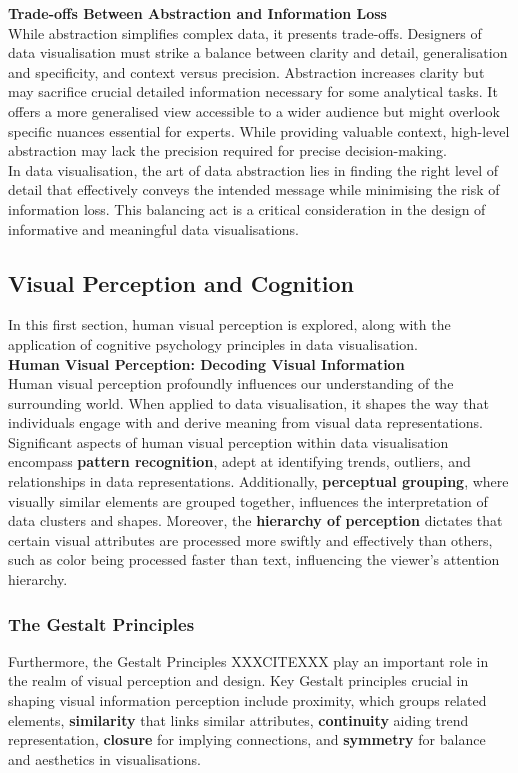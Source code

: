 \documentclass{article}\usepackage[]{graphicx}\usepackage[]{xcolor}
\begin{document}
\noindent \textbf{Trade-offs Between Abstraction and Information Loss}\\
While abstraction simplifies complex data, it presents trade-offs. Designers of data visualisation must strike a balance between clarity and detail, generalisation and specificity, and context versus precision. Abstraction increases clarity but may sacrifice crucial detailed information necessary for some analytical tasks. It offers a more generalised view accessible to a wider audience but might overlook specific nuances essential for experts. While providing valuable context, high-level abstraction may lack the precision required for precise decision-making.\\ 

In data visualisation, the art of data abstraction lies in finding the right level of detail that effectively conveys the intended message while minimising the risk of information loss. This balancing act is a critical consideration in the design of informative and meaningful data visualisations.

\subsection{Visual Perception and Cognition}
In this first section, human visual perception is explored, along with the application of cognitive psychology principles in data visualisation.\\ 

\noindent \textbf{Human Visual Perception: Decoding Visual Information}\\
Human visual perception profoundly influences our understanding of the surrounding world. When applied to data visualisation, it shapes the way that individuals engage with and derive meaning from visual data representations.\\

Significant aspects of human visual perception within data visualisation encompass \textbf{pattern recognition}, adept at identifying trends, outliers, and relationships in data representations. Additionally, \textbf{perceptual grouping}, where visually similar elements are grouped together, influences the interpretation of data clusters and shapes. Moreover, the \textbf{hierarchy of perception} dictates that certain visual attributes are processed more swiftly and effectively than others, such as color being processed faster than text, influencing the viewer's attention hierarchy.

\subsubsection{The Gestalt Principles}
Furthermore, the Gestalt Principles XXXCITEXXX play an important role in the realm of visual perception and design. Key Gestalt principles crucial in shaping visual information perception include proximity, which groups related elements, \textbf{similarity} that links similar attributes, \textbf{continuity} aiding trend representation, \textbf{closure} for implying connections, and \textbf{symmetry} for balance and aesthetics in visualisations.\\
\end{document}
